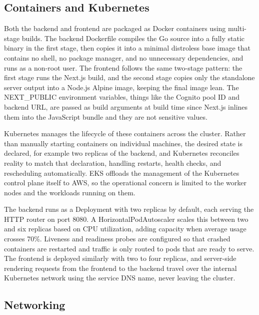 \subsection{Containers and Kubernetes}

\par Both the backend and frontend are packaged as Docker containers using multi-stage builds. The backend Dockerfile compiles the Go source into a fully static binary in the first stage, then copies it into a minimal distroless base image that contains no shell, no package manager, and no unnecessary dependencies, and runs as a non-root user. The frontend follows the same two-stage pattern: the first stage runs the Next.js build, and the second stage copies only the standalone server output into a Node.js Alpine image, keeping the final image lean. The NEXT\_PUBLIC environment variables, things like the Cognito pool ID and backend URL, are passed as build arguments at build time since Next.js inlines them into the JavaScript bundle and they are not sensitive values.

\par Kubernetes manages the lifecycle of these containers across the cluster. Rather than manually starting containers on individual machines, the desired state is declared, for example two replicas of the backend, and Kubernetes reconciles reality to match that declaration, handling restarts, health checks, and rescheduling automatically. EKS offloads the management of the Kubernetes control plane itself to AWS, so the operational concern is limited to the worker nodes and the workloads running on them.

\par The backend runs as a Deployment with two replicas by default, each serving the HTTP router on port 8080. A HorizontalPodAutoscaler scales this between two and six replicas based on CPU utilization, adding capacity when average usage crosses 70\%. Liveness and readiness probes are configured so that crashed containers are restarted and traffic is only routed to pods that are ready to serve. The frontend is deployed similarly with two to four replicas, and server-side rendering requests from the frontend to the backend travel over the internal Kubernetes network using the service DNS name, never leaving the cluster.

\subsection{Networking}

